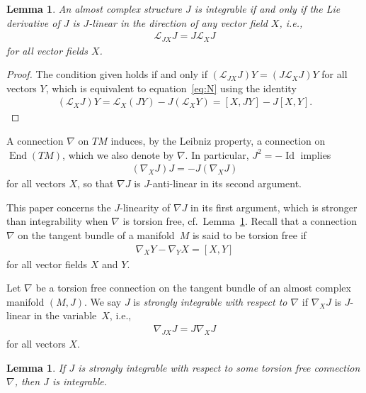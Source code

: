 \documentclass[10pt,a4paper]{amsart}
\newtheorem{lem}[thm]{Lemma}
\numberwithin{equation}{section}
\begin{document}
\begin{lem}An almost complex structure $J$ is integrable if and only if the Lie derivative of $J$ is $J$-linear in the direction of any vector field $X$, i.e.,
\begin{gather*}
\mathcal{L}_{JX} J = J \mathcal{L}_{X} J
\end{gather*}
for all vector fields $X$.
\end{lem}

\begin{proof}The condition given holds if and only if $( \mathcal{L}_{JX} J ) Y= ( J \mathcal{L}_{X} J ) Y$ for all vectors $Y$, which is equivalent to equation~\eqref{eq:N} using the identity
\begin{gather*}
( \mathcal{L}_{X} J ) Y = \mathcal{L}_{X} (JY) - J ( \mathcal{L}_{X} Y ) = [X,JY] - J[X,Y].\tag*{\qed}
\end{gather*} \renewcommand{\qed}{}
\end{proof}

A connection $\nabla$ on $TM$ induces, by the Leibniz property, a connection on $\operatorname{End}(TM)$, which we also denote by $\nabla$. In particular, $J^2=-\operatorname{Id}$ implies
\begin{gather*}
( \nabla_X J) J = -J (\nabla_X J)
\end{gather*}
for all vectors $X$, so that $\nabla J$ is $J$-anti-linear in its second argument.

This paper concerns the $J$-linearity of $\nabla J$ in its first argument, which is stronger than integrability when $\nabla$ is torsion free, cf.\ Lemma~\ref{lem;strongimpliesint}. Recall that a connection $\nabla$ on the tangent bundle of a manifold~$M$ is said to be torsion free if
 \begin{gather*}
 \nabla_X Y - \nabla_Y X = [X,Y]
 \end{gather*}
 for all vector fields $X$ and $Y$.

\begin{defn} \label{defn:strongint}
Let $\nabla$ be a torsion free connection on the tangent bundle of an almost complex manifold $(M,J)$. We say $J$ is \emph{strongly integrable with respect to $\nabla$} if $\nabla_X J$ is $J$-linear in the variable~$X$, i.e.,
\begin{gather*}
\nabla_{JX} J = J \nabla_X J
\end{gather*}
for all vectors $X$.
\end{defn}

\begin{lem} \label{lem;strongimpliesint}
If $J$ is strongly integrable with respect to some torsion free connection $\nabla$, then $J$ is integrable.
\end{lem}
\end{document}
